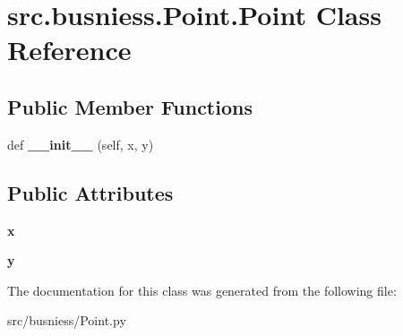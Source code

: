 \hypertarget{classsrc_1_1busniess_1_1_point_1_1_point}{}\section{src.\+busniess.\+Point.\+Point Class Reference}
\label{classsrc_1_1busniess_1_1_point_1_1_point}
\subsection*{Public Member Functions}
\begin{DoxyCompactItemize}
\item 
\mbox{\label{classsrc_1_1busniess_1_1_point_1_1_point_abb817405cabe5f9fa8ce5c68f1973acc}} 
def {\bfseries \+\_\+\+\_\+init\+\_\+\+\_\+} (self, x, y)
\end{DoxyCompactItemize}
\subsection*{Public Attributes}
\begin{DoxyCompactItemize}
\item 
\mbox{\label{classsrc_1_1busniess_1_1_point_1_1_point_aa4a3806183e52f2c7533da79e9ea5b9b}} 
{\bfseries x}
\item 
\mbox{\label{classsrc_1_1busniess_1_1_point_1_1_point_a3eafdf7c4e0ccd21c5e6a039b71ff909}} 
{\bfseries y}
\end{DoxyCompactItemize}


The documentation for this class was generated from the following file\+:\begin{DoxyCompactItemize}
\item 
src/busniess/Point.\+py\end{DoxyCompactItemize}
